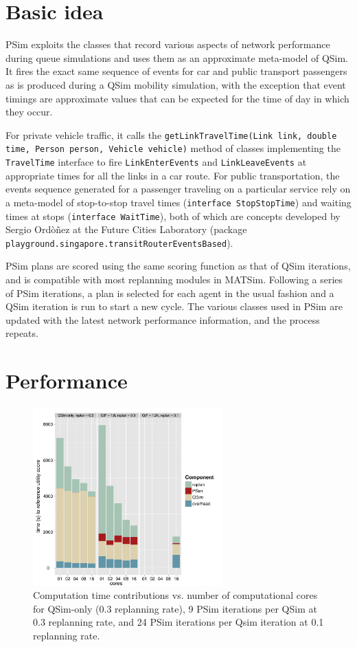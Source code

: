 \section{Basic idea}
PSim exploits the classes that record various aspects of network performance during queue simulations and uses them as an approximate meta-model of QSim. It fires the exact same sequence of events for car and public transport passengers as is produced during a QSim mobility simulation, with the exception that event timings are approximate values that can be expected for the time of day in which they occur.

For private vehicle traffic, it calls the \texttt{getLinkTravelTime(Link link, double time, Person person, Vehicle vehicle)} method of classes implementing the \texttt{TravelTime} interface to fire \texttt{LinkEnterEvents} and \texttt{LinkLeaveEvents} at appropriate times for all the links in a car route. For public transportation, the events sequence generated for a passenger traveling on a particular service rely on a meta-model of stop-to-stop travel times (\texttt{interface StopStopTime}) and waiting times at stops (\texttt{interface WaitTime}), both of which are concepts developed by Sergio Ord\`o\~nez at the Future Cities Laboratory (package \texttt{playground.singapore.transitRouterEventsBased}).

PSim plans are scored using the same scoring function as that of QSim iterations, and is compatible with most replanning modules in MATSim. Following a series of PSim iterations, a plan is selected for each agent in the usual fashion and a QSim iteration is run to start a new cycle. The various classes used in PSim are updated with the latest network performance information, and the process repeats.

\section{Performance}
\begin{figure}
\label{fig:PSimPerformance}
\begin{center} \includegraphics[width=0.65\textwidth, angle=0]{extending/figures/PSim/times} \end{center}
\caption{Computation time contributions vs. number of computational cores for QSim-only (0.3 replanning rate), 9 PSim iterations per QSim at 0.3 replanning rate, and 24 PSim iterations per Qsim iteration at 0.1 replanning rate.}
\end{figure}

